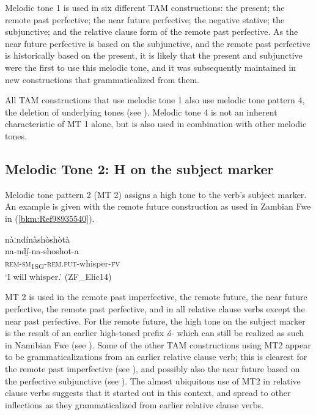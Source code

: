Melodic tone 1 is used in six different TAM constructions: the present; the remote past perfec\-tive; the near future perfective; the negative stative; the subjunctive; and the relative clause form of the remote past perfective. As the near future perfective is based on the subjunctive, and the remote past perfective is historically based on the present, it is likely that the present and subjunctive were the first to use this melodic tone, and it was subsequently maintained in new constructions that grammaticalized from them.

All TAM constructions that use melodic tone 1 also use melodic tone pattern 4, the deletion of underlying tones (see ). Melodic tone 4 is not an inherent characteristic of MT 1 alone, but is also used in combination with other melodic tones.

\subsection{Melodic Tone 2: H on the subject marker}\largerpage[-1]
\hypertarget{Toc75352630}{}
Melodic tone pattern 2 (MT 2) assigns a high tone to the verb’s subject marker. An example is given with the remote future construction as used in Zambian Fwe in (\ref{bkm:Ref98935540}).

\ea
\label{bkm:Ref98935540}
\glll nàːndínàshòshòtà\\
na-ndí̲-na-shoshot-a\\
\textsc{rem}-\textsc{sm}\textsubscript{1SG}-\textsc{rem}.\textsc{fut}-whisper-\textsc{fv}\\
\glt ‘I will whisper.’ (ZF\_Elic14)
\z

MT 2 is used in the remote past imperfective, the remote fu\-ture, the near future perfective, the remote past perfective, and in all relative clause verbs except the near past perfective. For the remote future, the high tone on the sub\-ject marker is the result of an earlier high-toned prefix \textit{á-} which can still be realized as such in Namibian Fwe (see ). Some of the other TAM constructions using MT2 appear to be grammaticalizations from an earlier relative clause verb; this is clearest for the remote past imperfective (see ), and possibly also the near future based on the perfective subjunctive (see ). The almost ubiquitous use of MT2 in relative clause verbs suggests that it started out in this context, and spread to other inflections as they grammaticalized from earlier relative clause verbs.

